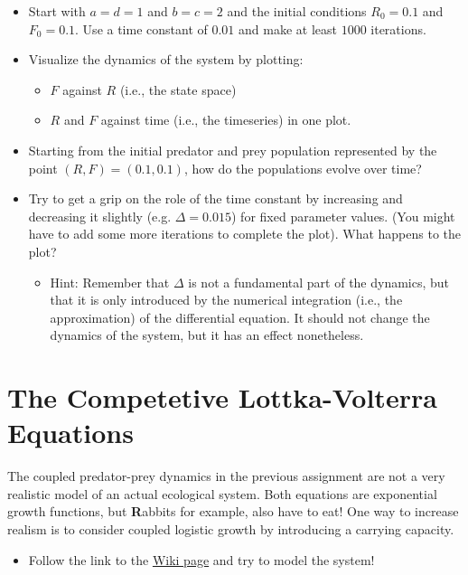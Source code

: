 \documentclass[]{book}
\providecommand{\tightlist}{%
  \setlength{\itemsep}{0pt}\setlength{\parskip}{0pt}}
\let\stdsection\section
\renewcommand\section{\newpage\stdsection}
\begin{document}
\begin{itemize}
\tightlist
\item
  Start with \(a = d = 1\) and \(b = c = 2\) and the initial conditions
  \(R_0 = 0.1\) and \(F_0 = 0.1\). Use a time constant of \(0.01\) and
  make at least \(1000\) iterations.
\item
  Visualize the dynamics of the system by plotting:

  \begin{itemize}
  \tightlist
  \item
    \(F\) against \(R\) (i.e., the state space)
  \item
    \(R\) and \(F\) against time (i.e., the timeseries) in one plot.
  \end{itemize}
\item
  Starting from the initial predator and prey population represented by
  the point \((R, F) = (0.1, 0.1)\), how do the populations evolve over
  time?
\item
  Try to get a grip on the role of the time constant by increasing and
  decreasing it slightly (e.g. \(\Delta = 0.015\)) for fixed parameter
  values. (You might have to add some more iterations to complete the
  plot). What happens to the plot?

  \begin{itemize}
  \tightlist
  \item
    Hint: Remember that \(\Delta\) is not a fundamental part of the
    dynamics, but that it is only introduced by the numerical
    integration (i.e., the approximation) of the differential equation.
    It should not change the dynamics of the system, but it has an
    effect nonetheless.
  \end{itemize}
\end{itemize}

\section{The Competetive Lottka-Volterra
Equations}\label{the-competetive-lottka-volterra-equations}

The coupled predator-prey dynamics in the previous assignment are not a
very realistic model of an actual ecological system. Both equations are
exponential growth functions, but \textbf{R}abbits for example, also
have to eat! One way to increase realism is to consider coupled logistic
growth by introducing a carrying capacity.

\begin{itemize}
\tightlist
\item
  Follow the link to the
  \href{https://en.wikipedia.org/wiki/Competitive_Lotka???Volterra_equations}{Wiki
  page} and try to model the system!
\end{itemize}
\end{document}
